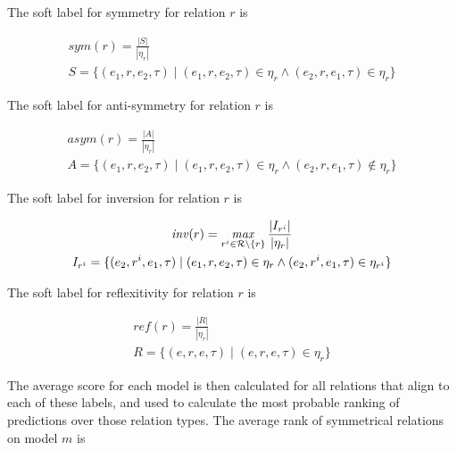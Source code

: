 The soft label for symmetry for relation $r$ is

\begin{equation}
\begin{gathered}
\mathit{sym}(r) = \frac{|S|}{|\eta_r|}\\
S = \{ (e_1, r, e_2, \tau) \mid (e_1, r, e_2, \tau) \in \eta_r \wedge (e_2, r, e_1, \tau) \in \eta_r \}
\end{gathered}
\end{equation}

\noindent
The soft label for anti-symmetry for relation $r$ is

\begin{equation}
\begin{gathered}
\mathit{asym}(r) = \frac{|A|}{|\eta_r|}\\
A = \{ (e_1, r, e_2, \tau) \mid (e_1, r, e_2, \tau) \in \eta_r \wedge (e_2, r, e_1, \tau) \notin \eta_r \}
\end{gathered}
\end{equation}

\noindent
The soft label for inversion for relation $r$ is

\begin{equation}
\begin{gathered}
\mathit{inv}(r) = \operatorname*{\mathit{max}}\limits_{r^i \in \mathcal{R} \setminus \{r\} } \frac{|I_{r^i}|}{|\eta_r|}\\
I_{r^i} = \{ (e_2, r^i, e_1, \tau) \mid (e_1, r, e_2, \tau) \in \eta_r \wedge (e_2, r^i, e_1, \tau) \in \eta_{r^i} \}
\end{gathered}
\end{equation}

\noindent
The soft label for reflexitivity for relation $r$ is

\begin{equation}
\begin{gathered}
\mathit{ref}(r) = \frac{|R|}{|\eta_r|}\\
R = \{ (e, r, e, \tau) \mid (e, r, e, \tau) \in \eta_r \}
\end{gathered}
\end{equation}

The average score for each model is then calculated for all relations that align to each of these labels, and used to calculate the most probable ranking of predictions over those relation types. The average rank of symmetrical relations on model $m$ is



